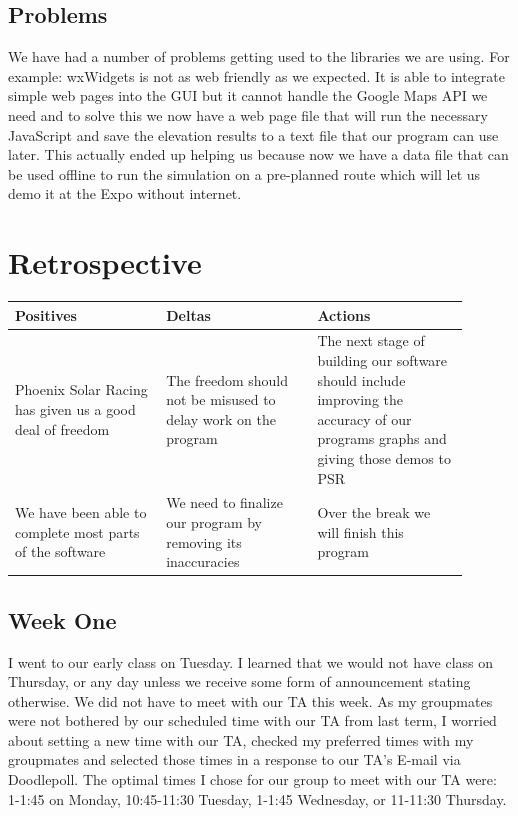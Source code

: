 \begin{singlespace}
\subsection{Problems}
We have had a number of problems getting used to the libraries we are using.
For example: wxWidgets \cite{wxWidgets} is not as web friendly as we expected.
It is able to integrate simple web pages into the GUI but it cannot handle the Google Maps API we need and to solve this we now have a web page file that will run the necessary JavaScript and save the elevation results to a text file that our program can use later.
This actually ended up helping us because now we have a data file that can be used offline to run the simulation on a pre-planned route which will let us demo it at the Expo without internet.

\section{Retrospective}

\vspace{1cm}
\begin{center}
	\begin{tabular}{|p{0.3\linewidth}|p{0.3\linewidth}|p{0.3\linewidth}|} 
		\hline
		Positives   & Deltas   & Actions   \\
		\hline
		Phoenix Solar Racing has given us a good deal of freedom & The freedom should not be misused to delay work on the program & The next stage of building our software should include improving the accuracy of our programs graphs and giving those demos to PSR \\
		We have been able to complete most parts of the software & We need to finalize our program by removing its inaccuracies & Over the break we will finish this program \\
		\hline
	\end{tabular}
\end{center}

\subsection{Week One}
I went to our early class on Tuesday.
I learned that we would not have class on Thursday, or any day unless we receive some form of announcement stating otherwise.
We did not have to meet with our TA this week.
As my groupmates were not bothered by our scheduled time with our TA from last term, I worried about setting a new time with our TA, checked my preferred times with my groupmates and selected those times in a response to our TA's E-mail via Doodlepoll.
The optimal times I chose for our group to meet with our TA were: 1-1:45 on Monday, 10:45-11:30 Tuesday, 1-1:45 Wednesday, or 11-11:30 Thursday.


\end{singlespace}
